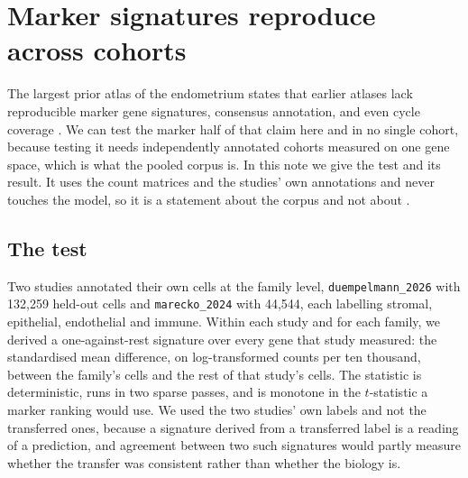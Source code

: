 %
%
%

\section{Marker signatures reproduce across cohorts}
\label{note:markers}

The largest prior atlas of the endometrium states that earlier atlases lack
reproducible marker gene signatures, consensus annotation, and even cycle
coverage \citep{mareckova2024heca}. We can test the marker half of that
claim here and in no single cohort, because testing it needs independently
annotated cohorts measured on one gene space, which is what the pooled
corpus is. In this note we give the test and its result. It uses the count
matrices and the studies' own annotations and never touches the model, so
it is a statement about the corpus and not about \elaj{}.

\subsection{The test}

Two studies annotated their own cells at the family level,
\texttt{duempelmann\_2026} with 132{,}259 held-out cells and
\texttt{marecko\_2024} with 44{,}544, each labelling stromal, epithelial,
endothelial and immune. Within each study and for each family, we derived a
one-against-rest signature over every gene that study measured: the
standardised mean difference, on log-transformed counts per ten thousand,
between the family's cells and the rest of that study's cells. The
statistic is deterministic, runs in two sparse passes, and is monotone in
the $t$-statistic a marker ranking would use. We used the two studies' own
labels and not the transferred ones, because a signature derived from a
transferred label is a reading of a prediction, and agreement between two
such signatures would partly measure whether the transfer was consistent
rather than whether the biology is.

